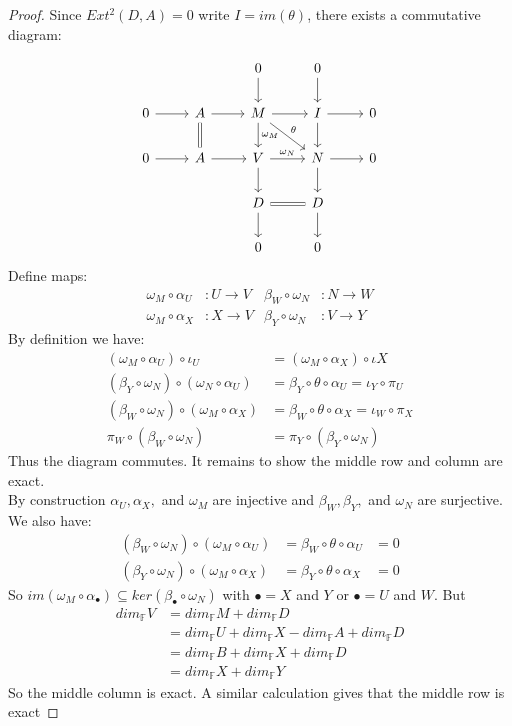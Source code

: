 \documentclass{book}
\begin{document}
\begin{proof}
Since $Ext^2(D,A)=0$ write $I=im(\theta)$, there exists a commutative diagram:

$$\begin{tikzcd}
            &&0 \arrow{d}&0\arrow{d}& \\ 
	0 \arrow{r}  & A \arrow{r} \arrow[d,equal]  & M \arrow{r} \arrow{d}{\omega_M} \arrow{dr}{\theta} & I \arrow{r} \arrow[d]   &0  \\ 
           0 \arrow{r}  & A \arrow{r}  & V \arrow{r}{\omega_N} \arrow{d}  & N \arrow{r} \arrow[d]   &0  \\ 
	&&D \arrow[r,equal] \arrow{d}&D\arrow{d}&\\
          &&0&0&
            \end{tikzcd}$$
Define maps:
\begin{align*} 
\omega_M \circ \alpha_U &: U \rightarrow V  &  \beta_W \circ \omega_N &: N \rightarrow W    \\
 \omega_M \circ \alpha_X &: X \rightarrow V   &   \beta_Y \circ \omega_N &: V \rightarrow Y
\end{align*}
 By definition we have: 
\begin{align*} 
(\omega_M \circ \alpha_U) \circ \iota_U &= (\omega_M \circ \alpha_X) \circ \iota X  \\
(\beta_Y \circ \omega_N) \circ (\omega_N \circ \alpha_U) &= \beta_Y \circ \theta \circ \alpha_U = \iota_Y \circ \pi_U \\
(\beta_W \circ \omega_N) \circ (\omega_M \circ \alpha_X) &= \beta_W \circ \theta \circ \alpha_X = \iota_W \circ \pi_X \\
\pi_W \circ (\beta_W \circ \omega_N)  &=  \pi_Y \circ  (\beta_Y \circ \omega_N)
\end{align*} 
Thus the diagram commutes. It remains to show the middle row and column are exact. \\
By construction $\alpha_U, \alpha_X,$ and $\omega_M$ are injective and $\beta_W, \beta_Y,$ and $\omega_N$ are surjective. \\
We also have:
\begin{align*} 
(\beta_W \circ \omega_N) \circ (\omega_M \circ \alpha_U) &= \beta_W \circ \theta \circ \alpha_U &= 0 \\
(\beta_Y \circ \omega_N) \circ (\omega_M \circ \alpha_X) &= \beta_Y \circ \theta \circ \alpha_X &= 0
\end{align*}
So $im(\omega_M \circ \alpha_{\bullet}) \subseteq ker(\beta_{\bullet} \circ \omega_N)$ with $\bullet = X$ and $Y$ or $\bullet = U$ and $W$. 
But 
\begin{align*} 
dim_{\mathbb{F}}V &= dim_{\mathbb{F}}M + dim_{\mathbb{F}}D \\
&=dim_{\mathbb{F}}U +dim_{\mathbb{F}}X - dim_{\mathbb{F}}A +dim_{\mathbb{F}}D \\
&= dim_{\mathbb{F}}B +dim_{\mathbb{F}}X + dim_{\mathbb{F}}D \\
&= dim_{\mathbb{F}}X + dim_{\mathbb{F}}Y
\end{align*}
So the middle column is exact. A similar calculation gives that the middle row is exact
\end{proof}
\end{document}

